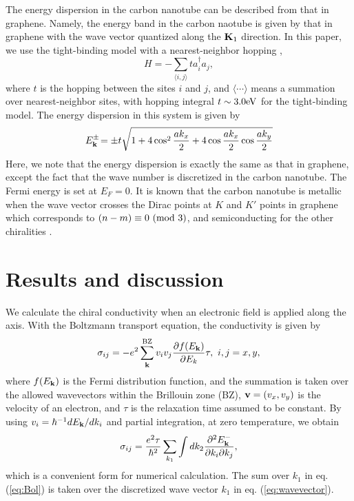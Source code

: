 \documentclass[journal=nalefd,manuscript=article,layout=twocolumn]{achemso}
\begin{document}
The energy dispersion in the carbon nanotube can be described from that in graphene. 
Namely, the energy band in the carbon naotube is given by that in graphene with the wave vector quantized along the ${\bf K}_1$ direction. 
In this paper, we use the tight-binding model with a nearest-neighbor hopping \cite{Miyamoto_1994,Hamada_1992,Saito_1992a,Saito_1992b},
\begin{equation}
H=-\sum_{\langle i,j\rangle}t a_i^{\dagger} a_j, 
\end{equation} 
where $t$ is the hopping between the sites $i$ and $j$, and 
$\langle\cdots\rangle$ means a summation over nearest-neighbor sites, 
with hopping integral 
$t\sim 3.0 {\rm eV}$ for the tight-binding model. 
The energy dispersion in this system is given by 
\begin{equation}
E_{\bf k}^{\pm}\!=\pm t\sqrt{1+4\cos^2 \frac{ak_x}{2}+
4\cos \frac{ak_x}{2}\cos \frac{ak_y}{2}} 
\end{equation}
Here, we note that the energy dispersion is exactly the
same as that in graphene, except the fact that the wave number is discretized in the carbon nanotube. 
The Fermi energy is set at $E_F=0$. It is known that 
the carbon nanotube is metallic when the wave vector crosses the Dirac points at 
$K$ and $K'$ points in graphene which corresponds to $(n-m)\equiv 0\ {\rm (mod\ 3)}$, and semiconducting for the other chiralities \cite{Ando_1998}. 
 
\section{Results and discussion}
We calculate the chiral conductivity when an electronic field is applied along the axis. 
With the Boltzmann transport equation, the conductivity is given by
\begin{equation}
\sigma_{ij}=-e^2\sum_{\bf k}^{\rm BZ}v_iv_j \frac{\partial f(E_{\bf k})}{\partial E_k}\tau,\ 
i,j=x,y,
\label{eq:Bol1}
\end{equation}
where $f(E_{\bf k})$ is the Fermi distribution function, and the summation is taken over the allowed wavevectors within the Brillouin zone (BZ), ${\bf v}=(v_x,v_y)$ is the velocity of an electron, and $\tau$ is the relaxation time assumed to be constant.
By using  $v_i=\hbar^{-1}dE_{\bf k}/dk_i$ and partial integration, at zero temperature, we obtain 
\begin{equation}
\sigma_{ij}=\frac{e^2\tau}{\hbar^2}\sum_{k_1}\int  dk_2\frac{\partial ^2E_{\bf k}^-}{\partial k_i\partial k_j}, 
\label{eq:Bol}
\end{equation}
which is a convenient form for numerical calculation. The sum over $k_1$ in eq. (\ref{eq:Bol}) is taken over the discretized wave vector $k_1$ in eq. (\ref{eq:wavevector}). 
\end{document}
